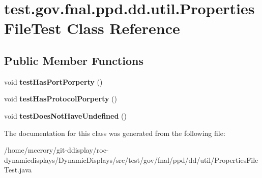 \hypertarget{classtest_1_1gov_1_1fnal_1_1ppd_1_1dd_1_1util_1_1PropertiesFileTest}{\section{test.\-gov.\-fnal.\-ppd.\-dd.\-util.\-Properties\-File\-Test Class Reference}
\label{classtest_1_1gov_1_1fnal_1_1ppd_1_1dd_1_1util_1_1PropertiesFileTest}
}
\subsection*{Public Member Functions}
\begin{DoxyCompactItemize}
\item 
\hypertarget{classtest_1_1gov_1_1fnal_1_1ppd_1_1dd_1_1util_1_1PropertiesFileTest_a8cfbcf6b00fd010a729a7c465d76de77}{void {\bfseries test\-Has\-Port\-Porperty} ()}\label{classtest_1_1gov_1_1fnal_1_1ppd_1_1dd_1_1util_1_1PropertiesFileTest_a8cfbcf6b00fd010a729a7c465d76de77}

\item 
\hypertarget{classtest_1_1gov_1_1fnal_1_1ppd_1_1dd_1_1util_1_1PropertiesFileTest_a111ec29545acfcabc893f8061864db6a}{void {\bfseries test\-Has\-Protocol\-Porperty} ()}\label{classtest_1_1gov_1_1fnal_1_1ppd_1_1dd_1_1util_1_1PropertiesFileTest_a111ec29545acfcabc893f8061864db6a}

\item 
\hypertarget{classtest_1_1gov_1_1fnal_1_1ppd_1_1dd_1_1util_1_1PropertiesFileTest_a81f9e60cdf7be477c8bfa619f600e4b4}{void {\bfseries test\-Does\-Not\-Have\-Undefined} ()}\label{classtest_1_1gov_1_1fnal_1_1ppd_1_1dd_1_1util_1_1PropertiesFileTest_a81f9e60cdf7be477c8bfa619f600e4b4}

\end{DoxyCompactItemize}


The documentation for this class was generated from the following file\-:\begin{DoxyCompactItemize}
\item 
/home/mccrory/git-\/ddisplay/roc-\/dynamicdisplays/\-Dynamic\-Displays/src/test/gov/fnal/ppd/dd/util/Properties\-File\-Test.\-java\end{DoxyCompactItemize}
